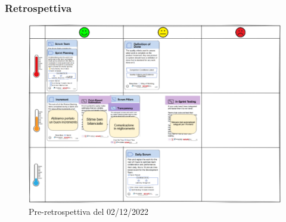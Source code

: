 \subsubsection{Retrospettiva}
\begin{figure}[H]
    \centering
    \includegraphics[width=15cm]{./img/sprint3/retrospettiva.png}
    \caption{Pre-retrospettiva del 02/12/2022}
\end{figure}
